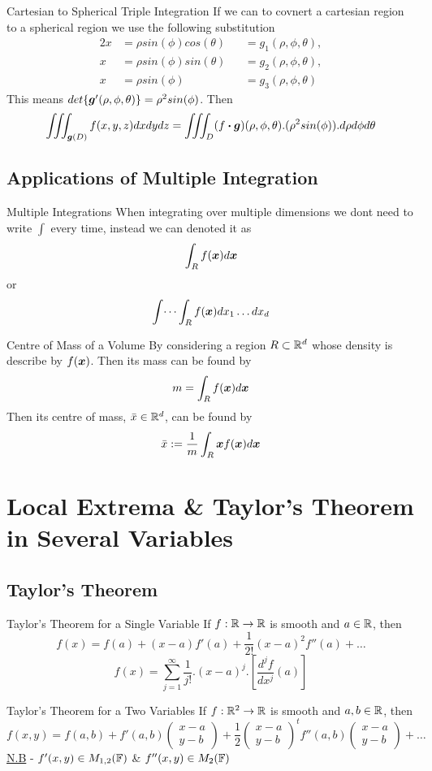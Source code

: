 \documentclass[11pt,a4paper]{article}
\begin{document}
\subtitle{Remark 14.5 - }{Cartesian to Spherical Triple Integration}
If we can to covnert a cartesian region to a spherical region we use the following substitution
\begin{alignat*}{2}
  x &= \rho sin(\phi) cos(\theta) &&= g_1(\rho, \phi, \theta), \\
  x &= \rho sin(\phi) sin(\theta) &&= g_2(\rho, \phi, \theta), \\
  x &= \rho sin(\phi) &&= g_3(\rho, \phi, \theta)
\end{alignat*}
This means $det\{ \boldsymbol{g}'(\rho, \phi, \theta) \} = \rho^2 sin(\phi)$. Then
$$\iiint_{\boldsymbol{g}(D)} f(x, y , z) dx dy dz = \iiint_D (f \boldsymbol{\cdot} \boldsymbol{g})(\rho, \phi, \theta).(\rho^2 sin(\phi)).d\rho d\phi d\theta$$

\subsection{Applications of Multiple Integration}

\subtitle{Definition 14.6 - }{Multiple Integrations}
When integrating over multiple dimensions we dont need to write $\int$ every time, instead we can denoted it as
$$\int_R f(\boldsymbol{x}) d\boldsymbol{x}$$
or
$$\int \dots \int_R f(\boldsymbol{x}) dx_1 \dots dx_d$$

\subtitle{Theorem 14.7 - }{Centre of Mass of a Volume}
By considering a region $R \subset \mathbb{R}^d$ whose density is describe by $f(\boldsymbol{x})$. Then its mass can be found by
$$m = \int_R f(\boldsymbol{x})d\boldsymbol{x}$$
Then its centre of mass, $\bar{x} \in \mathbb{R}^d$, can be found by $$\bar{x} := \frac{1}{m} \int_R \boldsymbol{x} f(\boldsymbol{x}) d\boldsymbol{x}$$

\section{Local Extrema \& Taylor's Theorem in Several Variables}

\subsection{Taylor's Theorem}

\subtitle{Theorem 15.1 - }{Taylor's Theorem for a Single Variable}
If $f : \mathbb{R} \to \mathbb{R}$ is smooth and $a \in \mathbb{R}$, then
$$f(x) = f(a) + (x-a)f'(a) + \frac{1}{2!}(x-a)^2f''(a) + \dots$$
$$f(x) = \sum_{j=1}^{\infty} \frac{1}{j!}.(x-a)^j.\left[\frac{d^jf}{dx^j}(a)\right]$$

\subtitle{Theorem 15.2 - }{Taylor's Theorem for a Two Variables}
If $f : \mathbb{R}^2 \to \mathbb{R}$ is smooth and $a, b \in \mathbb{R}$, then
$$f(x, y) = f(a,b) + f'(a,b)\begin{pmatrix} x-a \\ y-b \end{pmatrix} + \frac{1}{2} \begin{pmatrix} x-a \\ y-b\end{pmatrix}^tf''(a,b)\begin{pmatrix} x-a \\ y-b\end{pmatrix} + \dots$$
\underline{N.B} - $f'(x,y) \in M_{1,2}(\mathbb{F})$ \& $f''(x,y) \in M_2(\mathbb{F})$
\end{document}
